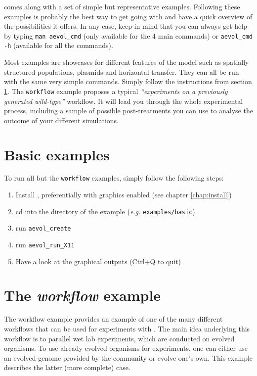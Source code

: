 \aevol{} comes along with a set of simple but representative examples. Following these examples is probably the best way to get going with \aevol{} and have a quick overview of the possibilities it offers. In any case, keep in mind that you can always get help by typing \verb?man aevol_cmd? (only available for the 4 main commands) or \verb?aevol_cmd -h? (available for all the commands).

Most examples are showcases for different features of the model such as spatially structured populations, plasmids and horizontal transfer. They can all be run with the same very simple commands. Simply follow the instructions from section \ref{sect:basic_examples}.
The \verb?workflow? example proposes a typical \emph{``experiments on a previously generated wild-type''} workflow. It will lead you through the whole experimental process, including a sample of possible post-treatments you can use to analyse the outcome of your different simulations.


\section{Basic examples}
\label{sect:basic_examples}

To run all but the \verb?workflow? examples, simply follow the following steps:

\begin{enumerate}
\item Install \aevol{}, preferentially with graphics enabled (see chapter \ref{chap:install})
\item cd into the directory of the example (\emph{e.g.} \verb?examples/basic?)
\item
run \verb?aevol_create?
\item
run \verb?aevol_run_X11?
\item Have a look at the graphical outputs (Ctrl+Q to quit)
\end{enumerate}


\section{The \emph{workflow} example}
The workflow example provides an example of one of the many different workflows that can be used for experiments with \aevol{}. The main idea underlying this workflow is to parallel wet lab experiments, which are conducted on evolved organisms. To use already evolved organisms for \aevol{} experiments, one can either use an evolved genome provided by the community or evolve one's own. This example describes the latter (more complete) case.


